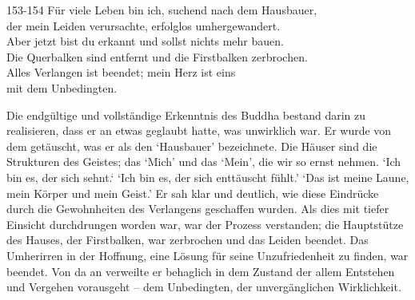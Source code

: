 
\begin{dhpVerse}{153-154}
\label{dhp-153}\label{dhp-154}
Für viele Leben bin ich, suchend nach dem Hausbauer,\\ 
der mein Leiden verursachte, erfolglos umhergewandert.\\ 
Aber jetzt bist du erkannt und sollst nichts mehr bauen.\\ 
Die Querbalken sind entfernt und die Firstbalken zerbrochen.\\ 
Alles Verlangen ist beendet; mein Herz ist eins\\ 
mit dem Unbedingten. 
\end{dhpVerse}

\begin{dhpRefl}

Die endgültige und vollständige Erkenntnis des Buddha bestand darin zu
realisieren, dass er an etwas geglaubt hatte, was unwirklich war. Er wurde von
dem getäuscht, was er als den `Hausbauer' bezeichnete. Die Häuser sind die
Strukturen des Geistes; das `Mich' und das `Mein', die wir so ernst nehmen.
`Ich bin es, der sich sehnt.‘ `Ich bin es, der sich enttäuscht fühlt.’ `Das
ist meine Laune, mein Körper und mein Geist.’ Er sah klar und deutlich, wie
diese Eindrücke durch die Gewohnheiten des Verlangens geschaffen wurden. Als
dies mit tiefer Einsicht durchdrungen worden war, war der Prozess verstanden;
die Hauptstütze des Hauses, der Firstbalken, war zerbrochen und das Leiden
beendet. Das Umherirren in der Hoffnung, eine Lösung für seine Unzufriedenheit
zu finden, war beendet. Von da an verweilte er behaglich in dem Zustand der
allem Entstehen und Vergehen vorausgeht -- dem Unbedingten, der
unvergänglichen Wirklichkeit.

\end{dhpRefl}
